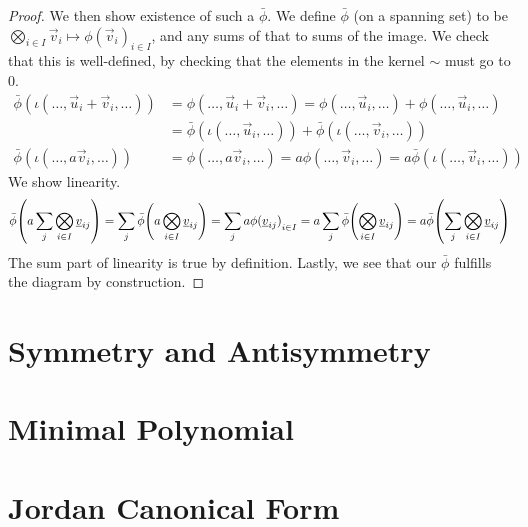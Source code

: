 \begin{proof}
    We then show existence of such a \(\bar{\phi}\).
    We define \(\bar{\phi}\) (on a spanning set) to be
    \(\bigotimes_{i \in I} \vec{v}_i \mapsto \phi{(\vec{v}_i)}_{i \in I}\),
    and any sums of that to sums of the image.
    We check that this is well-defined,
    by checking that the elements in the kernel \(\sim\) must go to 0.
    \begin{align*}
        \bar{\phi}(\iota(\hdots,\vec{u}_i+\vec{v}_i,\hdots))
        &= \phi(\hdots,\vec{u}_i+\vec{v}_i,\hdots)
        = \phi(\hdots,\vec{u}_i,\hdots) + \phi(\hdots,\vec{u}_i,\hdots) \\
        &= \bar{\phi}(\iota(\hdots,\vec{u}_i,\hdots))
        + \bar{\phi}(\iota(\hdots,\vec{v}_i,\hdots)) \\
        \bar{\phi}(\iota(\hdots,a\vec{v}_i,\hdots))
        &= \phi(\hdots,a\vec{v}_i,\hdots)
        = a\phi(\hdots,\vec{v}_i,\hdots)
        = a\bar{\phi}(\iota(\hdots,\vec{v}_i,\hdots))
    \end{align*}
    We show linearity.
    \begin{equation*}
        \bar{\phi}\pqty{a\sum_j \bigotimes_{i \in I} \vec{v}_{ij}}
        = \sum_j \bar{\phi}\pqty{a\bigotimes_{i \in I} \vec{v}_{ij}}
        = \sum_j a\phi{(\vec{v}_{ij})}_{i \in I}
        = a \sum_j \bar{\phi}\pqty{\bigotimes_{i \in I} \vec{v}_{ij}}
        = a \bar{\phi}\pqty{\sum_j \bigotimes_{i \in I} \vec{v}_{ij}}
    \end{equation*}
    The sum part of linearity is true by definition.
    Lastly, we see that our \(\bar{\phi}\) fulfills the diagram by construction.
\end{proof}


\section{Symmetry and Antisymmetry}


\section{Minimal Polynomial}


\section{Jordan Canonical Form}
